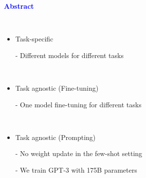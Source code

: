\documentclass[professionalfont]{beamer}
\begin{document}
\frame{\titlepage}

\begin{frame}
\begin{center}
    { \textbf{\textcolor{blue}{ {\fontsize{12}{14}\selectfont Abstract} }} }
\end{center}
\\[0.5cm]

{\fontsize{10}{14}\selectfont 
\begin{itemize}
    \item Task-specific
    
    - Different models for different tasks

    \\[0.3cm]

    \item Task agnostic (Fine-tuning)

    - One model fine-tuning for different tasks

    \\[0.3cm]

    \item Task agnostic (Prompting)

    - No weight update in the few-shot setting

    - We train GPT-3 with 175B parameters
\end{itemize}
}

\end{frame}
\end{document}
